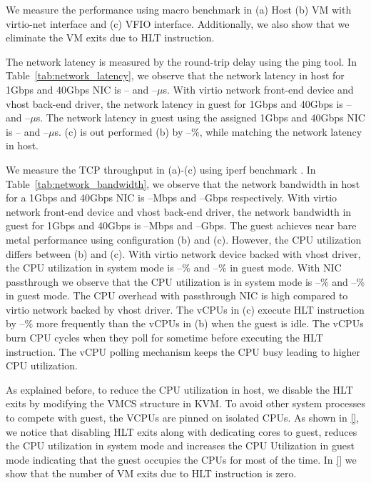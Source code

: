 We measure the performance using macro benchmark in (a) Host
(b) VM with virtio-net interface and (c) VFIO interface.
Additionally, we also show that we eliminate the VM exits due
to HLT instruction.

The network latency is measured by the round-trip delay using
the ping tool. In Table~\ref{tab:network_latency}, we observe
that the network latency in host for 1Gbps and 40Gbps NIC is
-- and --$\mu$s. With virtio network front-end device and
vhost back-end driver, the network latency in guest for 1Gbps
and 40Gbps is -- and --$\mu$s. The network latency in guest
using the assigned 1Gbps and 40Gbps NIC is -- and --$\mu$s.
(c) is out performed (b) by --\%, while matching the network
latency in host.

We measure the TCP throughput in (a)-(c) using iperf benchmark
\cite{}. In Table~\ref{tab:network_bandwidth}, we observe that
the network bandwidth in host for a 1Gbps and 40Gbps NIC is
--Mbps and --Gbps respectively. With virtio network front-end
device and vhost back-end driver, the network bandwidth in
guest for 1Gbps and 40Gbps is --Mbps and --Gbps. The guest
achieves near bare metal performance using configuration (b)
and (c).  However, the CPU utilization differs between (b) and
(c). With virtio network device backed with vhost driver, the
CPU utilization in system mode is --\% and --\% in guest mode.
With NIC passthrough we observe that the CPU utilization is in
system mode is --\% and --\% in guest mode. The CPU overhead
with passthrough NIC is high compared to virtio network backed
by vhost driver. The vCPUs in (c) execute HLT instruction by
--\% more frequently than the vCPUs in (b) when the guest is
idle. The vCPUs burn CPU cycles when they poll for sometime
before executing the HLT instruction. The vCPU polling
mechanism keeps the CPU busy leading to higher CPU
utilization.

As explained before, to reduce the CPU utilization in host, we
disable the HLT exits by modifying the VMCS structure in KVM.
To avoid other system processes to compete with guest, the
VCPUs are pinned on isolated CPUs. As shown in \ref{}, we
notice that disabling HLT exits along with dedicating cores to
guest, reduces the CPU utilization in system mode and
increases the CPU Utilization in guest mode indicating that
the guest occupies the CPUs for most of the time. In \ref{} we
show that the number of VM exits due to HLT instruction is
zero.
